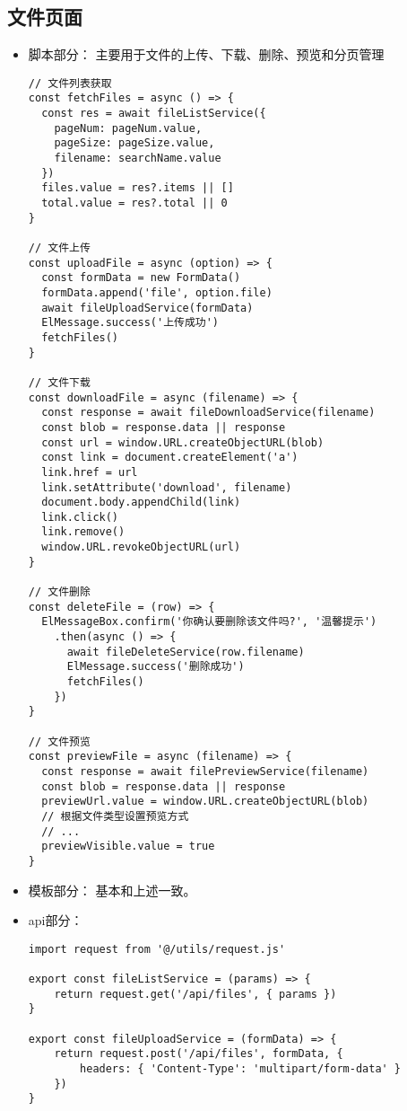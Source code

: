 \documentclass[bachelor]{thesis-uestc}
\begin{document}
\subsection{文件页面}

\begin{itemize}
\item 脚本部分：
主要用于文件的上传、下载、删除、预览和分页管理
\begin{lstlisting}
// 文件列表获取
const fetchFiles = async () => {
  const res = await fileListService({
    pageNum: pageNum.value,
    pageSize: pageSize.value,
    filename: searchName.value
  })
  files.value = res?.items || []
  total.value = res?.total || 0
}

// 文件上传
const uploadFile = async (option) => {
  const formData = new FormData()
  formData.append('file', option.file)
  await fileUploadService(formData)
  ElMessage.success('上传成功')
  fetchFiles()
}

// 文件下载
const downloadFile = async (filename) => {
  const response = await fileDownloadService(filename)
  const blob = response.data || response
  const url = window.URL.createObjectURL(blob)
  const link = document.createElement('a')
  link.href = url
  link.setAttribute('download', filename)
  document.body.appendChild(link)
  link.click()
  link.remove()
  window.URL.revokeObjectURL(url)
}

// 文件删除
const deleteFile = (row) => {
  ElMessageBox.confirm('你确认要删除该文件吗?', '温馨提示')
    .then(async () => {
      await fileDeleteService(row.filename)
      ElMessage.success('删除成功')
      fetchFiles()
    })
}

// 文件预览
const previewFile = async (filename) => {
  const response = await filePreviewService(filename)
  const blob = response.data || response
  previewUrl.value = window.URL.createObjectURL(blob)
  // 根据文件类型设置预览方式
  // ...
  previewVisible.value = true
}
\end{lstlisting}

\item 模板部分：
基本和上述一致。
\item api部分：
\begin{lstlisting}
import request from '@/utils/request.js'

export const fileListService = (params) => {
    return request.get('/api/files', { params })
}

export const fileUploadService = (formData) => {
    return request.post('/api/files', formData, {
        headers: { 'Content-Type': 'multipart/form-data' }
    })
}


\end{lstlisting}
\end{itemize}
\end{document}
